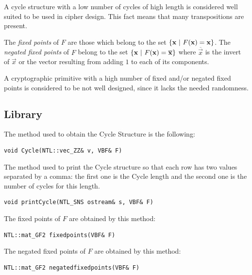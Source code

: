 A cycle structure with a low number of cycles of high length is considered well suited to be used in cipher design. This fact means that many transpositions are present.

The \textit{fixed points} of $F$ are those which belong to the set $\{ \vec{x} \given F(\vec{x})=\vec{x} \}$. The \textit{negated fixed points} of $F$ belong to the set $\{ \vec{x} \given F(\vec{x})= \overline{\vec{x}} \}$ where $\overline{\vec{x}}$ is the invert of $\vec{x}$ or the vector resulting from adding $1$ to each of its components. 

A cryptographic primitive with a high number of fixed and/or
negated fixed points is considered to be not well designed, since it lacks the needed randomness.

\subsection{Library}

The method used to obtain the Cycle Structure is the following:

\begin{verbatim}
void Cycle(NTL::vec_ZZ& v, VBF& F)
\end{verbatim}

The method used to print the Cycle structure so that each row has two values separated by a comma: the first one is the Cycle length and the second one is the number of cycles for this length.

\begin{verbatim}
void printCycle(NTL_SNS ostream& s, VBF& F)
\end{verbatim}

The fixed points of $F$ are obtained by this method:

\begin{verbatim}
NTL::mat_GF2 fixedpoints(VBF& F)
\end{verbatim}

The negated fixed points of $F$ are obtained by this method:

\begin{verbatim}
NTL::mat_GF2 negatedfixedpoints(VBF& F)
\end{verbatim}

